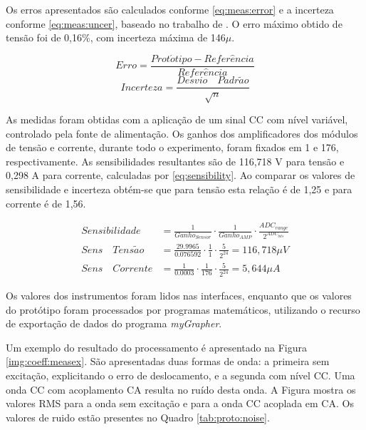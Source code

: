 		Os erros apresentados são calculados conforme \eqref{eq:meas:error} e a incerteza conforme \eqref{eq:meas:uncer}, baseado no trabalho de \textcite[][p.25]{npl132}. O erro máximo obtido de tensão foi de 0,16\%, com incerteza máxima de 146$\mu$.

		\begin{equation}
			\label{eq:meas:error}
			Erro = \frac{Prot\acute{o}tipo - Refer\hat{e}ncia}{Refer\hat{e}ncia}
		\end{equation}
		\begin{equation}
			\label{eq:meas:uncer}
			Incerteza = \frac{Desvio\quad Padr\tilde{a}o}{\sqrt{n}}
		\end{equation}

		As medidas foram obtidas com a aplicação de um sinal CC com nível variável, controlado pela fonte de alimentação. Os ganhos dos amplificadores dos módulos de tensão e corrente, durante todo o experimento, foram fixados em 1 e 176, respectivamente. As sensibilidades resultantes são de 116,718 V para tensão e 0,298 A para corrente, calculadas por \eqref{eq:sensibility}. Ao comparar os valores de sensibilidade e incerteza obtém-se que para tensão esta relação é de 1,25 e para corrente é de 1,56.

		\begin{align}
			\label{eq:sensibility}
			Sensibilidade &= \frac{1}{Ganho_{Sensor}} \cdot \frac{1}{Ganho_{AMP}} \cdot \frac{ADC_{range}}{2^{ADC_{bits}}}	\\[24pt]
			Sens\quad Tens\tilde{a}o &= \frac{29.9965}{0.076592} \cdot \frac{1}{1} \cdot \frac{5}{2^{24}} = 116,718\mu V		\\[24pt]
			Sens\quad Corrente &= \frac{1}{0.0003} \cdot \frac{1}{176} \cdot \frac{5}{2^{24}} = 5,644\mu A
		\end{align}

		Os valores dos instrumentos foram lidos nas interfaces, enquanto que os valores do protótipo foram processados por programas matemáticos, utilizando o recurso de exportação de dados do programa \textit{myGrapher}.

		Um exemplo do resultado do processamento é apresentado na Figura \ref{img:coeff:measex}. São apresentadas duas formas de onda: a primeira sem excitação, explicitando o erro de deslocamento, e a segunda com nível CC. Uma onda CC com acoplamento CA resulta no ruído desta onda. A Figura mostra os valores RMS para a onda sem excitação e para a onda CC acoplada em CA. Os valores de ruido estão presentes no Quadro \ref{tab:proto:noise}.

